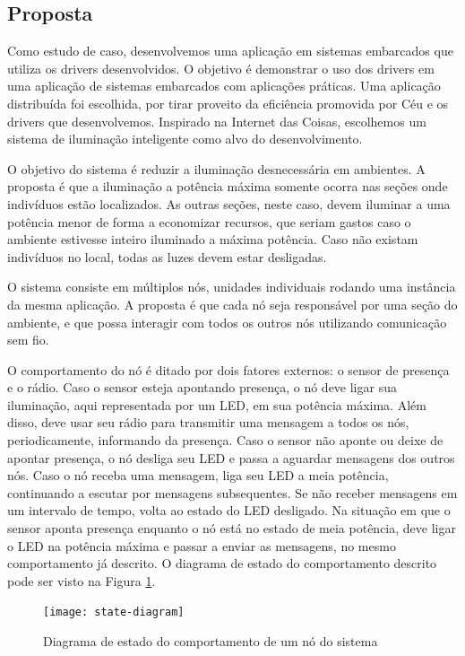 \documentclass[11pt]{article}
\begin{document}
\subsection{Proposta}
\tab Como estudo de caso, desenvolvemos uma aplicação em sistemas embarcados que utiliza os drivers desenvolvidos. O objetivo é demonstrar o uso dos drivers em uma aplicação de sistemas embarcados com aplicações práticas. Uma aplicação distribuída foi escolhida, por tirar proveito da eficiência promovida por Céu e os drivers que desenvolvemos. Inspirado na Internet das Coisas, escolhemos um sistema de iluminação inteligente como alvo do desenvolvimento.
\par O objetivo do sistema é reduzir a iluminação desnecessária em ambientes. A proposta é que a iluminação a potência máxima somente ocorra nas seções onde indivíduos estão localizados. As outras seções, neste caso, devem iluminar a uma potência menor de forma a economizar recursos, que seriam gastos caso o ambiente estivesse inteiro iluminado a máxima potência. Caso não existam indivíduos no local, todas as luzes devem estar desligadas.
\par O sistema consiste em múltiplos nós, unidades individuais rodando uma instância da mesma aplicação. A proposta é que cada nó seja responsável por uma seção do ambiente, e que possa interagir com todos os outros nós utilizando comunicação sem fio.
\par O comportamento do nó é ditado por dois fatores externos: o sensor de presença e o rádio. Caso o sensor esteja apontando presença, o nó deve ligar sua iluminação, aqui representada por um LED, em sua potência máxima. Além disso, deve usar seu rádio para transmitir uma mensagem a todos os nós, periodicamente, informando da presença. Caso o sensor não aponte ou deixe de apontar presença, o nó desliga seu LED e passa a aguardar mensagens dos outros nós. Caso o nó receba uma mensagem, liga seu LED a meia potência, continuando a escutar por mensagens subsequentes. Se não receber mensagens em um intervalo de tempo, volta ao estado do LED desligado. Na situação em que o sensor aponta presença enquanto o nó está no estado de meia potência, deve ligar o LED na potência máxima e passar a enviar as mensagens, no mesmo comportamento já descrito. O diagrama de estado do comportamento descrito pode ser visto na Figura \ref{state-diagram}.
\begin{figure}
    \centering
    \texttt{[image: state-diagram]}
    \caption{Diagrama de estado do comportamento de um nó do sistema}
    \label{state-diagram}
\end{figure}
\end{document}
